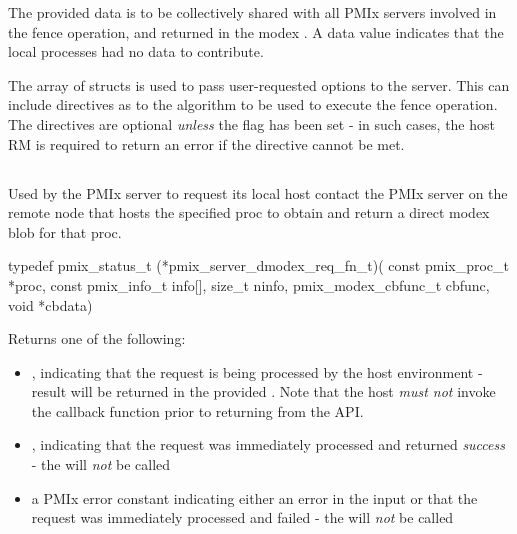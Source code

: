 The provided data is to be collectively shared with all \ac{PMIx} servers involved in the fence operation, and returned in the modex .
A  data value indicates that the local processes had no data to contribute.

The array of  structs is used to pass user-requested options to the server.
This can include directives as to the algorithm to be used to execute the fence operation.
The directives are optional \emph{unless} the  flag has been set - in such cases, the host \ac{RM} is required to return an error if the directive cannot be met.


\subsection{}

\summary

Used by the PMIx server to request its local host contact the \ac{PMIx} server on the remote node that hosts the specified proc to obtain and return a direct modex blob for that proc.

\format

\cspecificstart
\begin{codepar}
typedef pmix_status_t (*pmix_server_dmodex_req_fn_t)(
                             const pmix_proc_t *proc,
                             const pmix_info_t info[],
                             size_t ninfo,
                             pmix_modex_cbfunc_t cbfunc,
                             void *cbdata)
\end{codepar}
\cspecificend

\begin{arglist}
\end{arglist}

Returns one of the following:

\begin{itemize}
    \item {}, indicating that the request is being processed by the host environment - result will be returned in the provided . Note that the host \emph{must not} invoke the callback function prior to returning from the \ac{API}.
    \item {}, indicating that the request was immediately processed and returned \textit{success} - the  will \textit{not} be called
    \item a PMIx error constant indicating either an error in the input or that the request was immediately processed and failed - the  will \textit{not} be called
\end{itemize}

